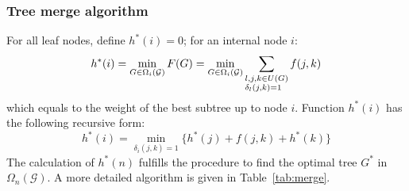 \documentclass[pdftex,10pt]{article}
\begin{document}
\subsubsection{Tree merge algorithm}

For all leaf nodes, define $h^*(i)=0$; for an internal node $i$:
\begin{equation*}
  h^*(i)=\min_{G\in\Omega_i(\mathcal{G})}F(G)
  =\min_{G\in\Omega_i(\mathcal{G})}\sum_{\begin{subarray}{1}l,j,k\in U(G)\\\delta_l(j,k)=1\end{subarray}}f(j,k)
\end{equation*}
which equals to the weight of the best subtree up to node $i$. Function
$h^*(i)$ has the following recursive form:
\begin{equation}
  h^*(i)=\min_{\delta_i(j,k)=1}\big\{h^*(j)+f(j,k)+h^*(k)\big\}
\end{equation}
The calculation of $h^*(n)$ fulfills the procedure to find
the optimal tree $G^*$ in $\Omega_n(\mathcal{G})$. A more detailed
algorithm is given in Table~\ref{tab:merge}.
\end{document}
